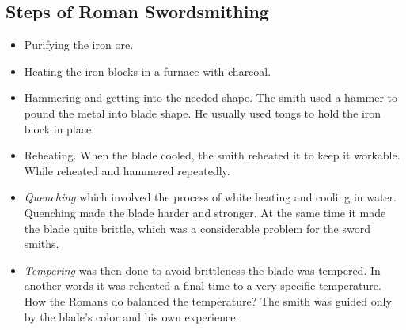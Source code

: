 \subsection{Steps of Roman Swordsmithing}
\begin{itemize}
\item Purifying the iron ore. 
\item Heating the iron blocks in a furnace with charcoal. 
\item Hammering and getting into the needed shape. The smith used a hammer to pound the metal into blade shape. He usually used tongs to hold the iron block in place. 
\item Reheating. When the blade cooled, the smith reheated it to keep it workable. While reheated and hammered repeatedly.
\item \emph{Quenching} which involved the process of white heating and cooling in water. Quenching made the blade harder and stronger. At the same time it made the blade quite brittle, which was a considerable problem for the sword smiths.
\item \emph{Tempering} was then done to avoid brittleness the blade was tempered. In another words it was reheated a final time to a very specific temperature. How the Romans do balanced the temperature? The smith was guided only by the blade's color and his own experience. 
\end{itemize}


